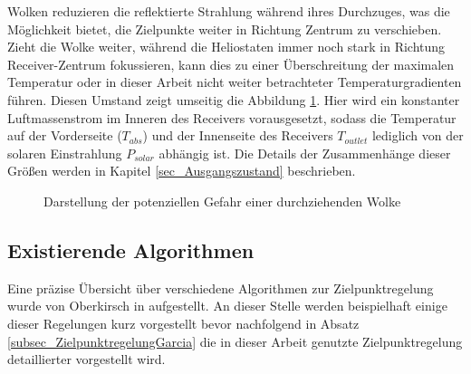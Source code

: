 Wolken reduzieren die reflektierte Strahlung während ihres Durchzuges, was die Möglichkeit bietet, die Zielpunkte weiter in Richtung Zentrum zu verschieben.
Zieht die Wolke weiter, während die Heliostaten immer noch stark in Richtung Receiver-Zentrum fokussieren, kann dies zu einer Überschreitung der maximalen Temperatur oder in dieser Arbeit nicht weiter betrachteter Temperaturgradienten führen.
Diesen Umstand zeigt umseitig die Abbildung \ref{fig_EinflussWolke}.
Hier wird ein konstanter Luftmassenstrom im Inneren des Receivers vorausgesetzt, sodass die Temperatur auf der Vorderseite ($T_{abs}$) und der Innenseite des Receivers $T_{outlet}$ lediglich von der solaren Einstrahlung $P_{solar}$ abhängig ist.
Die Details der Zusammenhänge dieser Größen werden in Kapitel \ref{sec_Ausgangszustand} beschrieben.

\enlargethispage*{\baselineskip}
\begin{figure}[h!]
    \centering
    \setlength{\fboxsep}{1pt}
    \setlength{\fboxrule}{1pt}
    \caption[Darstellung der potenziellen Gefahr einer durchziehenden Wolke]{Darstellung der potenziellen Gefahr einer durchziehenden Wolke}
    \label{fig_EinflussWolke}
\end{figure}

\subsection{Existierende Algorithmen} \label{subsec_ZielpunktregelungLiteratur}
Eine präzise Übersicht über verschiedene Algorithmen zur Zielpunktregelung wurde von Oberkirsch in \cite{DissOberkirsch} aufgestellt.
An dieser Stelle werden beispielhaft einige dieser Regelungen kurz vorgestellt bevor nachfolgend in Absatz \ref{subsec_ZielpunktregelungGarcia} die in dieser Arbeit genutzte Zielpunktregelung detaillierter vorgestellt wird.


